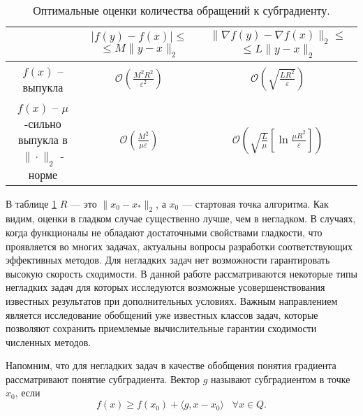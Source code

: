 \begin{table}[h]
    \caption{Оптимальные оценки количества обращений к субградиенту.}
    \label{est_tbl}
    \centering
    \begin{tabular}{|c|c|c|}
        \hline
         & \makecell{$|f(y) - f(x)| \leq$ \\ $\leq M \| y - x \|_2$} & \makecell{$\|\nabla f(y) - \nabla f(x)\|_2 \leq $\\ $\leq L \| y - x \|_2$} \\
        \hline
        $f(x)$ -- выпукла & $\mathcal{O} \left( \frac{M^2 R^2}{\varepsilon^2} \right)$ & $\mathcal{O} \left( \sqrt{\frac{L R^2}{\varepsilon}} \right)$ \\
        \hline
        \makecell{$f(x)$ -- $\mu$-сильно \\ выпукла в $\| \cdot \|_2$ - норме} & $\mathcal{O} \left( \frac{M^2}{\mu \varepsilon} \right)$ & $\mathcal{O} \left( \sqrt{\frac{L}{\mu}} \left[\ln{\frac{\mu R^2}{\varepsilon}}\right] \right)$ \\
        \hline
    \end{tabular}
\end{table}
В таблице \ref{est_tbl} $R$ --- это $\|x_0 - x_*\|_2 $, а $x_0$ --- стартовая точка алгоритма. Как видим, оценки в гладком случае существенно лучше, чем в негладком. В случаях, когда функционалы не обладают достаточными свойствами гладкости, что проявляется во многих задачах, актуальны вопросы разработки соответствующих эффективных методов. Для негладких задач нет возможности гарантировать высокую скорость сходимости. В данной работе рассматриваются некоторые типы негладких задач для которых исследуются возможные усовершенствования известных результатов при дополнительных условиях. Важным направлением является исследование обобщений уже известных классов задач, которые позволяют сохранить приемлемые вычислительные гарантии сходимости численных методов.

\iffalse
    Для улучшения оценок для негладких задач существует несколько подходов. Например, выделяют специальные подклассы задач, при помощи, например, условия острого минимума, предложенного в конце 1960-х годов Б.Т. Поляком \cite{Polyak1969}. Стоит подчеркнуть, что подобные условия зачастую выставляют более жесткие требования к задаче. 
\fi

Напомним, что для негладких задач в качестве обобщения понятия градиента рассматривают понятие субградиента. Вектор $g$ называют субградиентом в точке $x_0$, если
$$
    f(x) \geq f(x_0) + \langle g, x - x_0 \rangle \;\;\; \forall x \in Q.
$$

